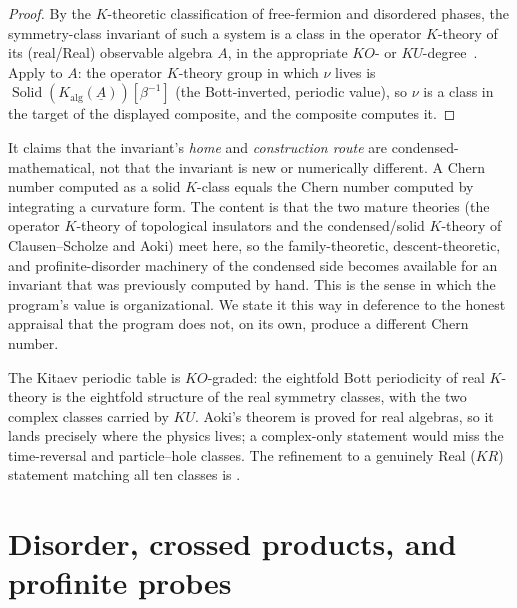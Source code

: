 \documentclass[12pt]{article}
\newcommand{\cond}[1]{\underline{#1}}          %
\newcommand{\Kalg}{K_{\mathrm{alg}}}           %
\newcommand{\Solid}{\operatorname{Solid}}      %
\theoremstyle{plain}
\begin{document}
\begin{proof}
By the $K$-theoretic classification of free-fermion and disordered phases, the
symmetry-class invariant of such a system is a class in the operator $K$-theory of
its (real/Real) observable algebra $A$, in the appropriate $KO$- or
$KU$-degree~\cite{kitaev-periodic-table,thiang-ktheory,prodan-sb}. Apply
 to $A$: the operator $K$-theory group in which $\nu$ lives is
$\Solid(\Kalg(\cond{A}))[\beta^{-1}]$ (the Bott-inverted, periodic value), so $\nu$ is
a class in the target of the displayed composite, and the composite computes it.
\end{proof}

\begin{remark}
It claims that the invariant's \emph{home} and \emph{construction route} are
condensed-mathematical, not that the invariant is new or numerically different. A
Chern number computed as a solid $K$-class equals the Chern number computed by
integrating a curvature form. The content is that the two mature theories (the
operator $K$-theory of topological insulators and the condensed/solid $K$-theory of
Clausen--Scholze and Aoki) meet here, so the family-theoretic, descent-theoretic,
and profinite-disorder machinery of the condensed side becomes available for an
invariant that was previously computed by hand. This is the sense in which the
program's value is organizational. We state it this way in deference to the honest
appraisal that the program does not, on its own, produce a different Chern number.
\end{remark}

\begin{remark}
The Kitaev periodic table is $KO$-graded: the eightfold Bott periodicity of real
$K$-theory is the eightfold structure of the real symmetry classes, with the two
complex classes carried by $KU$. Aoki's theorem is proved for real algebras, so it
lands precisely where the physics lives; a complex-only statement would miss the
time-reversal and particle--hole classes. The refinement to a genuinely Real ($KR$)
statement matching all ten classes is .
\end{remark}

\section{Disorder, crossed products, and profinite probes}
\label{sec:disorder}
\end{document}

